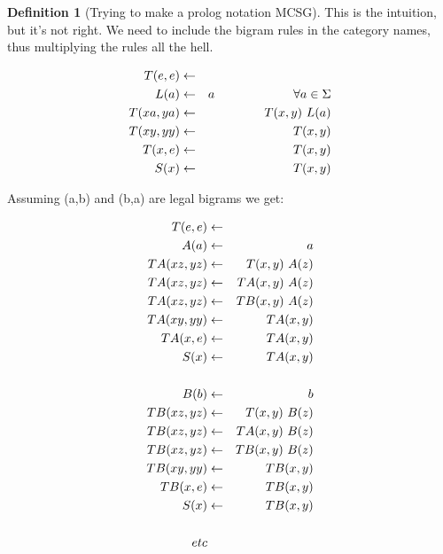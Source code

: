 \documentclass[12pt]{article}
\theoremstyle{definition}
\newtheorem{definition}{Definition}[section]
\begin{document}
\begin{definition}[Trying to make a prolog notation MCSG]
This is the intuition, but it's not right. We need to include the bigram rules in the category names, thus multiplying the rules all the hell.

  \begin{eqnarray*}
  T(e,e) &\leftarrow&\\ 
  L(a) &\leftarrow& a ~~~~~~~~~~~~~~~~~~~\forall a\in\Sigma\\
  T(xa,ya) &\leftarrow& T(x,y)~ L(a)  \\
  T(xy,yy) &\leftarrow& T(x,y)\\
  T(x,e) &\leftarrow& T(x,y)\\
  S(x) &\leftarrow& T(x,y)\\
  \end{eqnarray*}

Assuming (a,b) and (b,a) are legal bigrams we get:

  \begin{eqnarray*}
  T(e,e) &\leftarrow&\\ 
  A(a) &\leftarrow& a \\
  TA(xz,yz) &\leftarrow& T(x,y)~ A(z)  \\
  TA(xz,yz) &\leftarrow& TA(x,y)~ A(z)  \\
  TA(xz,yz) &\leftarrow& TB(x,y)~ A(z)  \\
  TA(xy,yy) &\leftarrow& TA(x,y)\\
  TA(x,e) &\leftarrow& TA(x,y)\\
  S(x) &\leftarrow& TA(x,y)\\
    \\
  B(b) &\leftarrow& b\\
  TB(xz,yz) &\leftarrow& T(x,y)~ B(z)  \\
  TB(xz,yz) &\leftarrow& TA(x,y)~ B(z)  \\
  TB(xz,yz) &\leftarrow& TB(x,y)~ B(z)  \\
  TB(xy,yy) &\leftarrow& TB(x,y)\\
  TB(x,e) &\leftarrow& TB(x,y)\\
  S(x) &\leftarrow& TB(x,y)\\
\\
etc\\
  \end{eqnarray*}



\end{definition}
\end{document}
